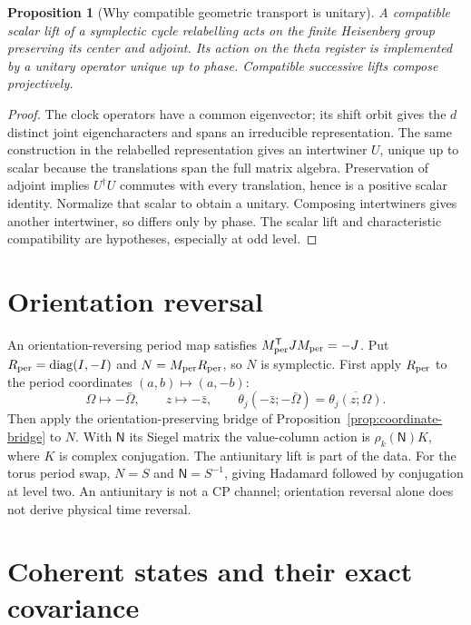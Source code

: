 \documentclass[11pt]{article}
\newtheorem{proposition}[theorem]{Proposition}
\theoremstyle{definition}
\theoremstyle{remark}
\begin{document}
\begin{proposition}[Why compatible geometric transport is unitary]\label{prop:geometric-unitarity}
A compatible scalar lift of a symplectic cycle relabelling acts on the
finite Heisenberg group preserving its center and adjoint. Its action
on the theta register is implemented by a unitary operator unique up to
phase. Compatible successive lifts compose projectively.
\end{proposition}
\begin{proof}
The clock operators have a common eigenvector; its shift orbit gives the
$d$ distinct joint eigencharacters and spans an irreducible representation.
The same construction in the relabelled representation gives an
intertwiner $U$, unique up to scalar because the translations span the
full matrix algebra. Preservation of adjoint implies $U^\dagger U$
commutes with every translation, hence is a positive scalar identity.
Normalize that scalar to obtain a unitary. Composing intertwiners gives
another intertwiner, so differs only by phase. The scalar lift and
characteristic compatibility are hypotheses, especially at odd level.
\end{proof}

\section{Orientation reversal}\label{sec:antiunitary}

An orientation-reversing period map satisfies
$M_{\rm per}^{\mathsf T}JM_{\rm per}=-J$. Put
$R_{\rm per}=\operatorname{diag}(I,-I)$ and
$N=M_{\rm per}R_{\rm per}$, so $N$ is symplectic.
First apply $R_{\rm per}$ to the period coordinates $(a,b)\mapsto(a,-b)$:
\[
 \Omega\mapsto-\bar\Omega,\qquad z\mapsto-\bar z,\qquad
 \theta_j(-\bar z;-\bar\Omega)=\overline{\theta_j(z;\Omega)}.
\]
Then apply the orientation-preserving bridge of
Proposition~\ref{prop:coordinate-bridge} to $N$. With
$\mathsf N$ its Siegel matrix the value-column action is
$\rho_k(\mathsf N)K$, where $K$ is complex conjugation.
The antiunitary lift is part of the data.
For the torus period swap, $N=S$ and $\mathsf N=S^{-1}$, giving Hadamard
followed by conjugation at level two. An antiunitary is not a CP channel;
orientation reversal alone does not derive physical time reversal.

\section{Coherent states and their exact covariance}\label{sec:coherent}
\end{document}
